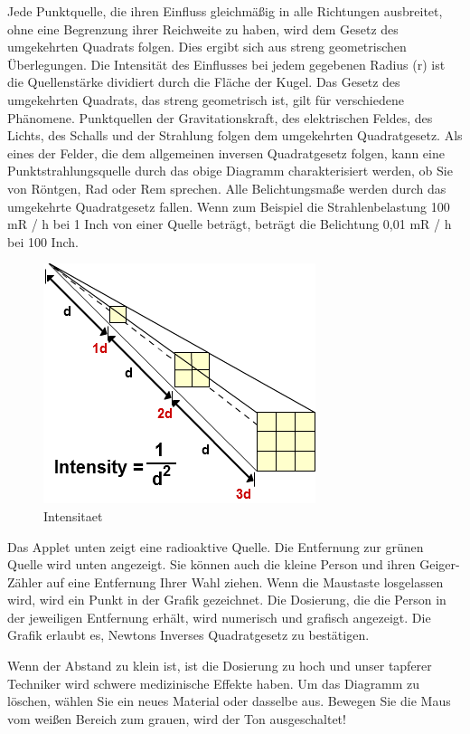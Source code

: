 Jede Punktquelle, die ihren Einfluss gleichmäßig in alle Richtungen ausbreitet, ohne eine Begrenzung ihrer Reichweite zu haben, wird dem Gesetz des umgekehrten Quadrats folgen. Dies ergibt sich aus streng geometrischen Überlegungen. Die Intensität des Einflusses bei jedem gegebenen Radius (r) ist die Quellenstärke dividiert durch die Fläche der Kugel. Das Gesetz des umgekehrten Quadrats, das streng geometrisch ist, gilt für verschiedene Phänomene. Punktquellen der Gravitationskraft, des elektrischen Feldes, des Lichts, des Schalls und der Strahlung folgen dem umgekehrten Quadratgesetz.
Als eines der Felder, die dem allgemeinen inversen Quadratgesetz folgen, kann eine Punktstrahlungsquelle durch das obige Diagramm charakterisiert werden, ob Sie von Röntgen, Rad oder Rem sprechen. Alle Belichtungsmaße werden durch das umgekehrte Quadratgesetz fallen.
Wenn zum Beispiel die Strahlenbelastung 100 mR / h bei 1 Inch von einer Quelle beträgt, beträgt die Belichtung 0,01 mR / h bei 100 Inch.
\begin{figure}[htb]
  \centering  
  \includegraphics[scale=0.5]{img/Intensitaet.png}
  \caption{Intensitaet}
  \label{fig:Intensitaet}
\end{figure}
Das Applet unten zeigt eine radioaktive Quelle. Die Entfernung zur grünen Quelle wird unten angezeigt. Sie können auch die kleine Person und ihren Geiger-Zähler auf eine Entfernung Ihrer Wahl ziehen. Wenn die Maustaste losgelassen wird, wird ein Punkt in der Grafik gezeichnet. Die Dosierung, die die Person in der jeweiligen Entfernung erhält, wird numerisch und grafisch angezeigt. Die Grafik erlaubt es, Newtons Inverses Quadratgesetz zu bestätigen.

Wenn der Abstand zu klein ist, ist die Dosierung zu hoch und unser tapferer Techniker wird schwere medizinische Effekte haben. Um das Diagramm zu löschen, wählen Sie ein neues Material oder dasselbe aus. Bewegen Sie die Maus vom weißen Bereich zum grauen, wird der Ton ausgeschaltet!





 
 
 


